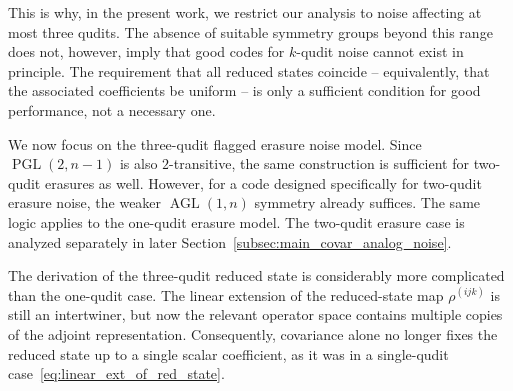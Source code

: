 \documentclass[10pt,twocolumn,superscriptaddress,aps,amsmath,amssymb,citeautoscript,floatfix,prx,longbibliography]{revtex4-2}
\theoremstyle{plain}
\theoremstyle{plain}
\theoremstyle{plain}
\theoremstyle{plain}
\theoremstyle{plain}
\theoremstyle{plain}
\begin{document}
This is why, in the present work, we restrict our analysis to noise affecting at most three qudits. The absence of suitable symmetry groups beyond this range does not, however, imply that good codes for $k$-qudit noise cannot exist in principle. The requirement that all reduced states coincide -- equivalently, that the associated coefficients be uniform -- is only a sufficient condition for good performance, not a necessary one.

We now focus on the three-qudit flagged erasure noise model. Since \(\operatorname{PGL}(2,n-1)\) is also \(2\)-transitive, the same construction is sufficient for two-qudit erasures as well. However, for a code designed specifically for two-qudit erasure noise, the weaker \(\operatorname{AGL}(1,n)\) symmetry already suffices. The same logic applies to the one-qudit erasure model. The two-qudit erasure case is analyzed separately in later Section~\ref{subsec:main_covar_analog_noise}. 

The derivation of the three-qudit reduced state is considerably more complicated than the one-qudit case. The linear extension of the reduced-state map
\(\rho^{(ijk)}\) is still an intertwiner, but now the relevant operator space contains multiple copies of the adjoint representation. Consequently, covariance alone no longer fixes the reduced state up to a single scalar coefficient, as it was in a single-qudit case~\eqref{eq:linear_ext_of_red_state}.
\end{document}
